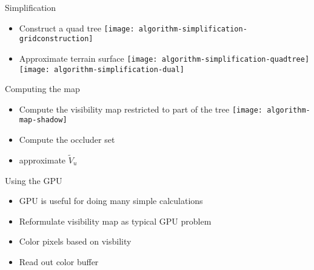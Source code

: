 \begin{frame}{Simplification}
	\begin{itemize}
		\item Construct a quad tree
			\only<1> {
				\texttt{[image: algorithm-simplification-gridconstruction]}
			}
		\item Approximate terrain surface
			\only<2> {
				\texttt{[image: algorithm-simplification-quadtree]}
			}
			\only<3> {
				\texttt{[image: algorithm-simplification-dual]}
			}
	\end{itemize}
\end{frame}

\begin{frame}{Computing the map}
	\begin{itemize}
		\item Compute the visibility map restricted to part of the tree
			\only<1> {
				\texttt{[image: algorithm-map-shadow]}
			}
		\item Compute the occluder set
		\item approximate $\tilde{V}_u$
	\end{itemize}
\end{frame}

\begin{frame}{Using the GPU}
	\begin{itemize}
		\item GPU is useful for doing many simple calculations
		\item Reformulate visibility map as typical GPU problem
		\item Color pixels based on visbility
		\item Read out color buffer
	\end{itemize}
\end{frame}
